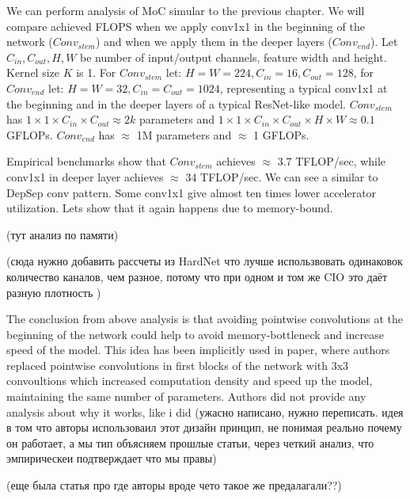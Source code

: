 We can perform analysis of MoC simular to the previous chapter. We will compare achieved FLOPS when we apply conv1x1 in the beginning of the network ($Conv_{stem}$) and when we apply them in the deeper layers ($Conv_{end}$). Let $C_{in}, C_{out}, H, W$ be number of input/output channels, feature width and height. Kernel size $K$ is 1. For $Conv_{stem}$ let:  $H=W=224, C_{in} = 16, C_{out}=128$, for $Conv_{end}$ let: $H=W=32, C_{in} = C_{out}=1024$, representing a typical conv1x1 at the beginning and in the deeper layers of a typical ResNet-like model.
$Conv_{stem}$ has $ 1 \times 1 \times C_{in} \times C_{out} \approx 2k$ parameters and $ 1 \times 1 \times C_{in} \times C_{out} \times H \times W \approx 0.1 $ GFLOPs. $Conv_{end}$ has $\approx$ 1M parameters and $\approx$ 1 GFLOPs. 

%

Empirical benchmarks show that $Conv_{stem}$ achieves $\approx$ 3.7 TFLOP/sec, while conv1x1 in deeper layer achieves $\approx$ 34 TFLOP/sec. We can see a similar to DepSep conv pattern. Some conv1x1 give almost ten times lower accelerator utilization. Lets show that it again happens due to memory-bound.

(тут анализ по памяти)

(сюда нужно добавить рассчеты из HardNet что лучше использвовать одинаковок количество каналов, чем разное, потому что при одном и том же CIO это даёт разную плотность )

The conclusion from above analysis is that avoiding pointwise convolutions at the beginning of the network could help to avoid memory-bottleneck and increase speed of the model. This idea has been implicitly used in \cite{ridnik2021_tresnet} paper, where authors replaced pointwise convolutions in first blocks of the network with 3x3 convoultions which increased computation density and speed up the model, maintaining the same number of parameters. Authors did not provide any analysis about why it works, like i did (ужасно написано, нужно переписать. идея в том что авторы использоваил этот дизайн принцип, не понимая реально почему он работает, а мы тип объясняем прошлые статьи, через четкий анализ, что эмпирическеи подтверждает что мы правы)


(еще была статья про \cite{zhou2020_rethinking} где авторы вроде чето такое же предалагали??)


